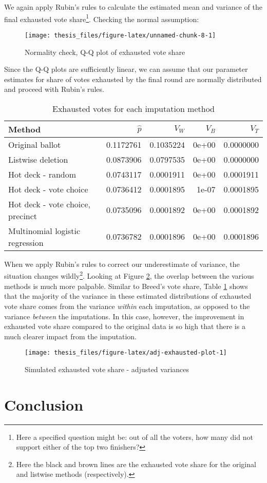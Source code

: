 \documentclass[12pt,twoside]{reedthesis}
\begin{document}
We again apply Rubin's rules to calculate the estimated mean and variance of the final exhausted vote share\footnote{Here a specified question might be: out of all the voters, how many did not support either of the top two finishers?}. Checking the normal assumption:
\begin{figure}
\texttt{[image: thesis\_files/figure-latex/unnamed-chunk-8-1]} \caption{Normality check, Q-Q plot of exhausted vote share}\label{fig:unnamed-chunk-8}
\end{figure}
Since the Q-Q plots are sufficiently linear, we can assume that our parameter estimates for share of votes exhausted by the final round are normally distributed and proceed with Rubin's rules.
\begin{table}[t]

\caption[Simulated exhausted votes]{\label{tab:adj-exhausted-tab}Exhausted votes for each imputation method}
\centering
\begin{tabular}{lrrrr}
\toprule
Method & $\hat{p}$ & $V_W$ & $V_B$ & $V_T$\\
\midrule
Original ballot & 0.1172761 & 0.1035224 & 0e+00 & 0.0000000\\
Listwise deletion & 0.0873906 & 0.0797535 & 0e+00 & 0.0000000\\
Hot deck - random & 0.0743117 & 0.0001911 & 0e+00 & 0.0001911\\
Hot deck - vote choice & 0.0736412 & 0.0001895 & 1e-07 & 0.0001895\\
Hot deck - vote choice, precinct & 0.0735096 & 0.0001892 & 0e+00 & 0.0001892\\
\addlinespace
Multinomial logistic regression & 0.0736782 & 0.0001896 & 0e+00 & 0.0001896\\
\bottomrule
\end{tabular}
\end{table}
When we apply Rubin's rules to correct our underestimate of variance, the situation changes wildly\footnote{Here the black and brown lines are the exhausted vote share for the original and listwise methods (respectively).}. Looking at Figure \ref{fig:adj-exhausted-plot}, the overlap between the various methods is much more palpable. Similar to Breed's vote share, Table \ref{tab:adj-exhausted-tab} shows that the majority of the variance in these estimated distributions of exhausted vote share comes from the variance \emph{within} each imputation, as opposed to the variance \emph{between} the imputations. In this case, however, the improvement in exhausted vote share compared to the original data is so high that there is a much clearer impact from the imputation.
\begin{figure}
\texttt{[image: thesis\_files/figure-latex/adj-exhausted-plot-1]} \caption{Simulated exhausted vote share - adjusted variances}\label{fig:adj-exhausted-plot}
\end{figure}
\hypertarget{conclusion}{%
\chapter*{Conclusion}\label{conclusion}}
\end{document}

